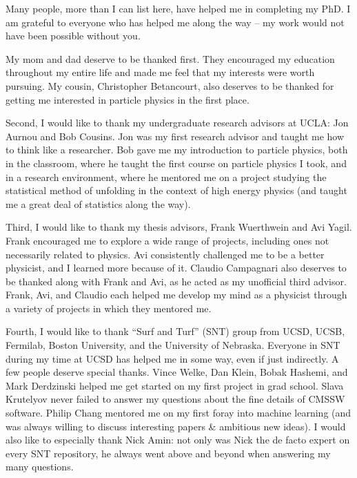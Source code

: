 \begin{frontmatter}
%
%
\begin{acknowledgements}
    Many people, more than I can list here, have helped me in completing my PhD.
    I am grateful to everyone who has helped me along the way -- my work would not have been possible without you.

    My mom and dad deserve to be thanked first. They encouraged my education throughout my entire life and made me feel that my interests were worth pursuing.
    My cousin, Christopher Betancourt, also deserves to be thanked for getting me interested in particle physics in the first place.

    Second, I would like to thank my undergraduate research advisors at UCLA: Jon Aurnou and Bob Cousins.
    Jon was my first research advisor and taught me how to think like a researcher.
    Bob gave me my introduction to particle physics, both in the classroom, where he taught the first course on particle physics I took, and in a research environment, where he mentored me on a project studying the statistical method of unfolding in the context of high energy physics (and taught me a great deal of statistics along the way).
    
    Third, I would like to thank my thesis advisors, Frank Wuerthwein and Avi Yagil.
    Frank encouraged me to explore a wide range of projects, including ones not necessarily related to physics.
    Avi consistently challenged me to be a better physicist, and I learned more because of it.
    Claudio Campagnari also deserves to be thanked along with Frank and Avi, as he acted as my unofficial third advisor.
    Frank, Avi, and Claudio each helped me develop my mind as a physicist through a variety of projects in which they mentored me.

    Fourth, I would like to thank ``Surf and Turf'' (SNT) group from UCSD, UCSB, Fermilab, Boston University, and the University of Nebraska.
    Everyone in SNT during my time at UCSD has helped me in some way, even if just indirectly.
    A few people deserve special thanks. 
    Vince Welke, Dan Klein, Bobak Hashemi, and Mark Derdzinski helped me get started on my first project in grad school.
    Slava Krutelyov never failed to answer my questions about the fine details of CMSSW software.
    Philip Chang mentored me on my first foray into machine learning (and was always willing to discuss interesting papers \& ambitious new ideas).
    I would also like to especially thank Nick Amin: not only was Nick the de facto expert on every SNT repository, he always went above and beyond when answering my many questions. 


\end{acknowledgements}
\end{frontmatter}
